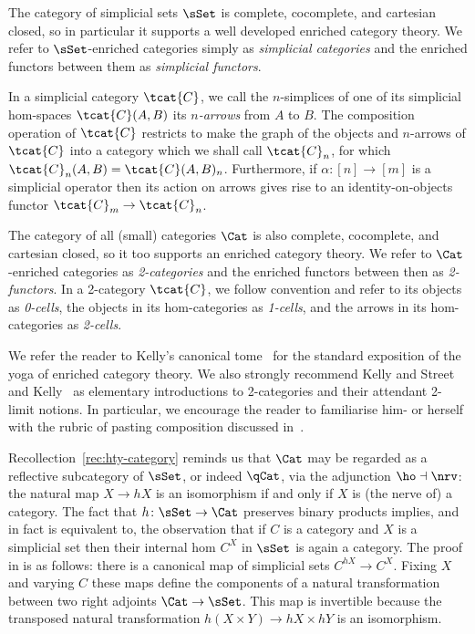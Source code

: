 \begin{ntn}
  The category of simplicial sets $\sSet$ is complete, cocomplete, and cartesian closed, so in particular it supports a well developed enriched category theory. We refer to $\sSet$-enriched categories simply as {\em simplicial categories\/} and the enriched functors between them as {\em simplicial functors}.

In a simplicial category $\tcat{C}$, we call the $n$-simplices of one of its simplicial hom-spaces $\tcat{C}(A,B)$ its {\em $n$-arrows\/} from $A$ to $B$. The composition operation of $\tcat{C}$ restricts to make the graph of the objects and $n$-arrows of $\tcat{C}$ into a category which we shall call $\tcat{C}_n$, for which $\tcat{C}_n(A,B) = \tcat{C}(A,B)_n$. Furthermore, if $\alpha\colon[n]\to[m]$ is a simplicial operator then its action on arrows gives rise to an identity-on-objects functor $\tcat{C}_m\to\tcat{C}_n$.

The category of all (small) categories $\Cat$ is also complete, cocomplete, and cartesian closed, so it too supports an enriched category theory. We refer to $\Cat$-enriched categories as {\em 2-categories\/} and the enriched functors between then as {\em 2-functors}. In a 2-category $\tcat{C}$, we follow convention and refer to its objects as {\em 0-cells}, the objects in its hom-categories as {\em 1-cells}, and the arrows in its hom-categories as {\em 2-cells}. 

  We refer the reader to Kelly's canonical tome~\cite{Kelly:2005:ECT} for the standard exposition of the yoga of enriched category theory. We also strongly recommend Kelly and Street~\cite{kelly.street:2} and Kelly~\cite{Kelly:1989fk} as elementary introductions to 2-categories and their attendant 2-limit notions. In particular, we encourage the reader to familiarise him- or herself with the rubric of pasting composition discussed in~\cite{kelly.street:2}.
\end{ntn}


  Recollection~\ref{rec:hty-category} reminds us that $\Cat$ may be regarded as a reflective subcategory of $\sSet$, or indeed $\qCat$, via the adjunction $\ho \dashv \nrv$: the natural map $X \to hX$ is an isomorphism if and only if $X$ is (the nerve of) a category.  The fact that $h\colon \sSet\to \Cat$ preserves binary products implies, and in fact is equivalent to, the observation that if $C$ is a category and $X$ is a simplicial set then their internal hom $C^X$ in $\sSet$ is again a category. The proof in \cite[B.0.16]{Joyal:2008tq} is as follows: there is a canonical map of simplicial sets $C^{hX} \to C^X$. Fixing $X$ and varying $C$ these maps define the components of a natural transformation between two right adjoints $\Cat\to\sSet$. This map is invertible because the transposed natural transformation $h(X\times Y) \to hX \times hY$ is an isomorphism.

